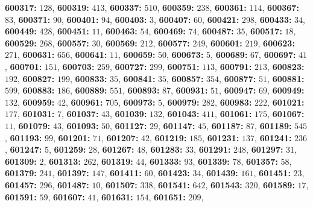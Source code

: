 \textsf{\bfseries 600317:} $128$, \textsf{\bfseries 600319:} $413$, \textsf{\bfseries 600337:} $510$, \textsf{\bfseries 600359:} $238$, \textsf{\bfseries 600361:} $114$, \textsf{\bfseries 600367:} $83$, \textsf{\bfseries 600371:} $90$, \textsf{\bfseries 600401:} $94$, \textsf{\bfseries 600403:} $3$, \textsf{\bfseries 600407:} $60$, \textsf{\bfseries 600421:} $298$, \textsf{\bfseries 600433:} $34$, \textsf{\bfseries 600449:} $428$, \textsf{\bfseries 600451:} $11$, \textsf{\bfseries 600463:} $54$, \textsf{\bfseries 600469:} $74$, \textsf{\bfseries 600487:} $35$, \textsf{\bfseries 600517:} $18$, \textsf{\bfseries 600529:} $268$, \textsf{\bfseries 600557:} $30$, \textsf{\bfseries 600569:} $212$, \textsf{\bfseries 600577:} $249$, \textsf{\bfseries 600601:} $219$, \textsf{\bfseries 600623:} $271$, \textsf{\bfseries 600631:} $656$, \textsf{\bfseries 600641:} $11$, \textsf{\bfseries 600659:} $50$, \textsf{\bfseries 600673:} $5$, \textsf{\bfseries 600689:} $67$, \textsf{\bfseries 600697:} $41$, \textsf{\bfseries 600701:} $151$, \textsf{\bfseries 600703:} $259$, \textsf{\bfseries 600727:} $299$, \textsf{\bfseries 600751:} $113$, \textsf{\bfseries 600791:} $213$, \textsf{\bfseries 600823:} $192$, \textsf{\bfseries 600827:} $199$, \textsf{\bfseries 600833:} $35$, \textsf{\bfseries 600841:} $35$, \textsf{\bfseries 600857:} $354$, \textsf{\bfseries 600877:} $51$, \textsf{\bfseries 600881:} $599$, \textsf{\bfseries 600883:} $186$, \textsf{\bfseries 600889:} $551$, \textsf{\bfseries 600893:} $87$, \textsf{\bfseries 600931:} $51$, \textsf{\bfseries 600947:} $69$, \textsf{\bfseries 600949:} $132$, \textsf{\bfseries 600959:} $42$, \textsf{\bfseries 600961:} $705$, \textsf{\bfseries 600973:} $5$, \textsf{\bfseries 600979:} $282$, \textsf{\bfseries 600983:} $222$, \textsf{\bfseries 601021:} $177$, \textsf{\bfseries 601031:} $7$, \textsf{\bfseries 601037:} $43$, \textsf{\bfseries 601039:} $132$, \textsf{\bfseries 601043:} $411$, \textsf{\bfseries 601061:} $175$, \textsf{\bfseries 601067:} $11$, \textsf{\bfseries 601079:} $43$, \textsf{\bfseries 601093:} $50$, \textsf{\bfseries 601127:} $29$, \textsf{\bfseries 601147:} $45$, \textsf{\bfseries 601187:} $87$, \textsf{\bfseries 601189:} $545$, \textsf{\bfseries 601193:} $99$, \textsf{\bfseries 601201:} $71$, \textsf{\bfseries 601207:} $42$, \textsf{\bfseries 601219:} $185$, \textsf{\bfseries 601231:} $137$, \textsf{\bfseries 601241:} $236$, \textsf{\bfseries 601247:} $5$, \textsf{\bfseries 601259:} $28$, \textsf{\bfseries 601267:} $48$, \textsf{\bfseries 601283:} $33$, \textsf{\bfseries 601291:} $248$, \textsf{\bfseries 601297:} $31$, \textsf{\bfseries 601309:} $2$, \textsf{\bfseries 601313:} $262$, \textsf{\bfseries 601319:} $44$, \textsf{\bfseries 601333:} $93$, \textsf{\bfseries 601339:} $78$, \textsf{\bfseries 601357:} $58$, \textsf{\bfseries 601379:} $241$, \textsf{\bfseries 601397:} $147$, \textsf{\bfseries 601411:} $60$, \textsf{\bfseries 601423:} $34$, \textsf{\bfseries 601439:} $161$, \textsf{\bfseries 601451:} $23$, \textsf{\bfseries 601457:} $296$, \textsf{\bfseries 601487:} $10$, \textsf{\bfseries 601507:} $338$, \textsf{\bfseries 601541:} $642$, \textsf{\bfseries 601543:} $320$, \textsf{\bfseries 601589:} $17$, \textsf{\bfseries 601591:} $59$, \textsf{\bfseries 601607:} $41$, \textsf{\bfseries 601631:} $154$, \textsf{\bfseries 601651:} $209$, 
